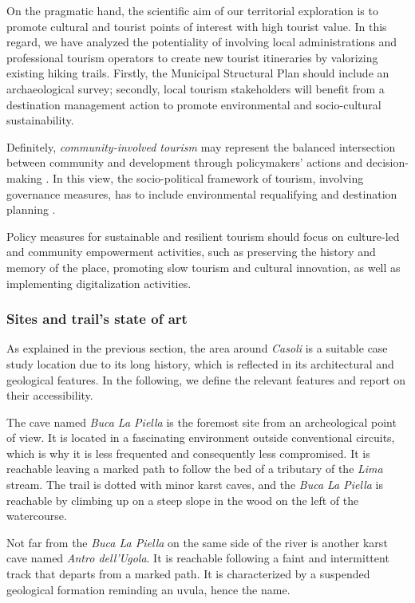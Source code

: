 \documentclass[sustainability,article,submit,pdftex,moreauthors]{Definitions/mdpi}
\begin{document}
On the pragmatic hand, the scientific aim of our territorial exploration is to promote cultural and tourist points of interest with high tourist value. 
In this regard, we have analyzed the potentiality of involving local administrations and professional tourism operators to create new tourist itineraries by valorizing existing hiking trails.
Firstly, the Municipal Structural Plan should include an archaeological survey; secondly, local tourism stakeholders will benefit from a destination management action to promote environmental and socio-cultural sustainability. 

Definitely, \textit{community-involved tourism} may represent the balanced intersection between community and development through policymakers' actions and decision-making \cite {jam14}.
In this view, the socio-political framework of tourism, involving governance measures, has to include environmental requalifying and destination planning \cite {ric03}. 

Policy measures for sustainable and resilient tourism should focus on culture-led and community empowerment activities, such as preserving the history and memory of the place, promoting slow tourism and cultural innovation, as well as implementing digitalization activities.

\subsubsection{Sites and trail’s state of art}

As explained in the previous section, the area around \textit{Casoli} is a suitable case study location due to its long history, which is reflected in its architectural and geological features. In the following, we define the relevant features and report on their accessibility.

The cave named {\em Buca La Piella} is the foremost site from an archeological point of view. It is located in a fascinating environment outside conventional circuits, which is why it is less frequented and consequently less compromised. It is reachable leaving a marked path to follow the bed of a tributary of the \emph{Lima} stream. The trail is dotted with minor karst caves, and the {\em Buca La Piella} is reachable by climbing up on a steep slope in the wood on the left of the watercourse. 

Not far from the {\em Buca La Piella} on the same side of the river is another karst cave named {\em Antro dell'Ugola}. It is reachable following a faint and intermittent track that departs from a marked path. It is characterized by a suspended geological formation reminding an uvula, hence the name.
\end{document}
